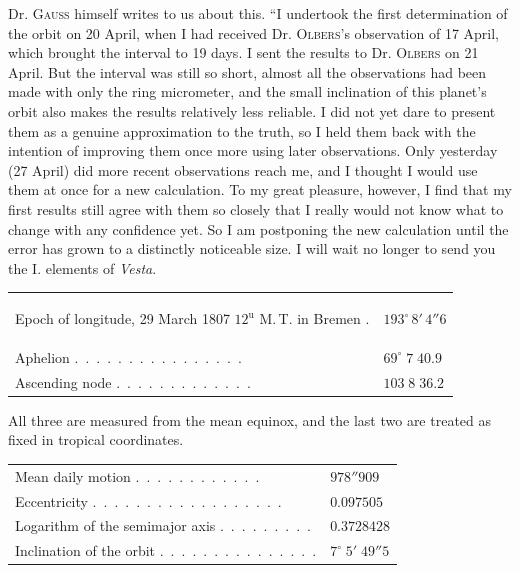 \par\indent Dr. \textsc{Gauss} himself writes to us about this. “I undertook the first determination of the orbit on 20 April, when I had received Dr. \textsc{Olbers}’s observation of 17 April, which brought the interval to 19 days. I sent the results to Dr. \textsc{Olbers} on 21 April. But the interval was still so short, almost all the observations had been made with only the ring micrometer, and the small inclination of this planet’s orbit also makes the results relatively less reliable. I did not yet dare to present them as a genuine approximation to the truth, so I held them back with the intention of improving them once more using later observations. Only yesterday (27 April) did more recent observations reach me, and I thought I would use them at once for a new calculation. To my great pleasure, however, I find that my first results still agree with them so closely that I really would not know what to change with any confidence yet. So I am postponing the new calculation until the error has grown to a distinctly noticeable size. I will wait no longer to send you the I. elements of \emph{Vesta}.

\begin{center}\begingroup\fontsize{9}{11}\selectfont
\begin{tabular}{ll}
\hypertarget{vesta1807-first-elements}{}\shortstack[l]{Epoch of longitude, 29 March 1807\\$12^{\text{u}}$ M.\,T. in Bremen} . & $193^\circ\,8'\,4''6$ \\
Aphelion .\ .\ .\ .\ .\ .\ .\ .\ .\ .\ .\ .\ .\ .\ .\ . & $69^\circ\;7\;40.9$ \\
Ascending node .\ .\ .\ .\ .\ .\ .\ .\ .\ .\ .\ .\ . & $103\;8\;36.2$
\end{tabular}\endgroup\end{center}

\noindent All three are measured from the mean equinox, and the last two are treated as fixed in tropical coordinates.

\begin{center}\begingroup\fontsize{9}{11}\selectfont
\begin{tabular}{ll}
Mean daily motion .\ .\ .\ .\ .\ .\ .\ .\ .\ .\ .\ . & $978''909$ \\
Eccentricity .\ .\ .\ .\ .\ .\ .\ .\ .\ .\ .\ .\ .\ .\ .\ .\ .\ . & $0.097505$ \\
Logarithm of the semimajor axis .\ .\ .\ .\ .\ .\ .\ .\ . & $0.3728428$ \\
Inclination of the orbit .\ .\ .\ .\ .\ .\ .\ .\ .\ .\ .\ .\ .\ .\ . & $7^\circ\;5'\;49''5$
\end{tabular}\endgroup\end{center}

